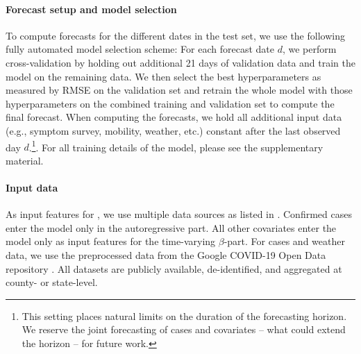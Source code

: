 \paragraph{Forecast setup and model selection} To compute forecasts for the
different dates in the test set, we use the following fully automated model
selection scheme: For each forecast date \(d\), we perform cross-validation by
holding out additional 21 days of validation data and train the model on the
remaining data. We then select the best hyperparameters as measured by RMSE on
the validation set and retrain the whole model with those hyperparameters on the
combined training and validation set to compute the final forecast. When
computing the forecasts, we hold all additional input data (e.g., symptom
survey, mobility, weather, etc.) constant after the last observed day
\(d\).\footnote{This setting places natural limits on the duration of the forecasting
horizon. We reserve the joint forecasting of cases and covariates -- what could
extend the horizon -- for future work.}. For all training details of the model,
please see the supplementary material.


\paragraph{Input data} As input features for \bAR, we use multiple data sources
as listed in . Confirmed cases enter the model only in the
autoregressive part. All other covariates enter the model only as input features
for the time-varying \(\beta\)-part. For cases and weather data, we use the
preprocessed data from the Google COVID-19 Open Data repository
\citep{data/Wahltinez2020}. All datasets are publicly available, de-identified,
and aggregated at county- or state-level.

